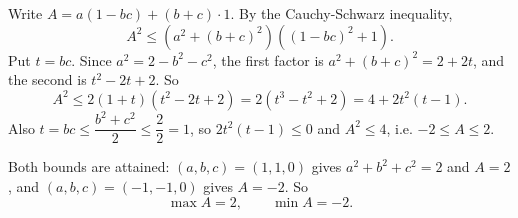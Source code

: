 Write $A=a(1-bc)+(b+c)\cdot1$. By the Cauchy-Schwarz inequality,
\[
A^2\le\left(a^2+(b+c)^2\right)\left((1-bc)^2+1\right).
\]
Put $t=bc$. Since $a^2=2-b^2-c^2$, the first factor is $a^2+(b+c)^2=2+2t$, and the second is $t^2-2t+2$. So
\[
A^2\le2(1+t)(t^2-2t+2)=2\left(t^3-t^2+2\right)=4+2t^2(t-1).
\]
Also $t=bc\le\dfrac{b^2+c^2}{2}\le\dfrac{2}{2}=1$, so $2t^2(t-1)\le0$ and $A^2\le4$, i.e. $-2\le A\le2$.

Both bounds are attained: $(a,b,c)=(1,1,0)$ gives $a^2+b^2+c^2=2$ and $A=2$, and $(a,b,c)=(-1,-1,0)$ gives $A=-2$. So
\[
\boxed{\max A=2,\qquad \min A=-2}.
\]
